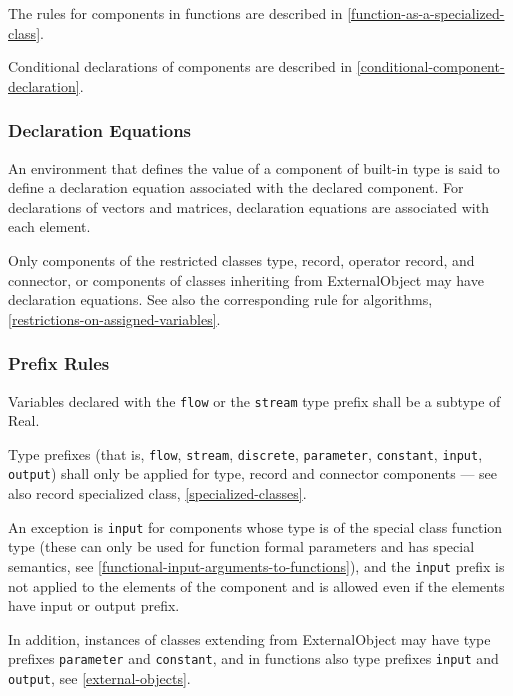 The rules for components in functions are described in \cref{function-as-a-specialized-class}.

Conditional declarations of components are described in \cref{conditional-component-declaration}.

\subsubsection{Declaration Equations}\label{declaration-equations}

An environment that defines the value of a component of built-in type is
said to define a declaration equation associated with the declared
component. For declarations of vectors and matrices, declaration
equations are associated with each element.

Only components of the restricted classes type, record, operator record, and connector, or components of classes inheriting from ExternalObject
may have declaration equations. See also the corresponding rule for algorithms, \cref{restrictions-on-assigned-variables}.

\subsubsection{Prefix Rules}\label{prefix-rules}

Variables declared with the \lstinline!flow! or the \lstinline!stream! type prefix shall be a
subtype of Real.

Type prefixes (that is, \lstinline!flow!, \lstinline!stream!, \lstinline!discrete!, \lstinline!parameter!, \lstinline!constant!, \lstinline!input!, \lstinline!output!) shall only be applied for type,
record and connector components --- see also record specialized class, \cref{specialized-classes}.

An exception is \lstinline!input! for components whose type is of the special class
function type (these can only be used for function formal parameters and
has special semantics, see \cref{functional-input-arguments-to-functions}), and the \lstinline!input! prefix is not
applied to the elements of the component and is allowed even if the
elements have input or output prefix.

In addition, instances of classes extending from ExternalObject may have type prefixes \lstinline!parameter! and \lstinline!constant!, and in functions also type prefixes \lstinline!input! and
\lstinline!output!, see \cref{external-objects}.

